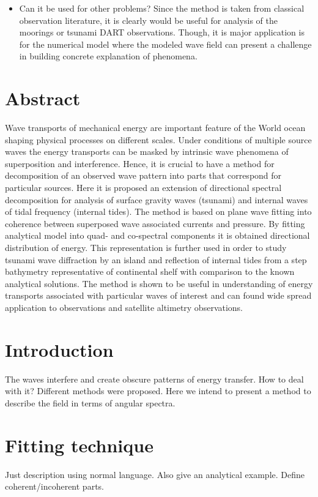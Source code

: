 \begin{itemize}
\item Can it be used for other problems?
Since the method is taken from classical observation literature, it is clearly would be useful for analysis of the moorings or tsunami DART observations. Though, it is major application is for the numerical model where the modeled wave field can present a challenge in building concrete explanation of phenomena.
\end{itemize}

\section{Abstract}
Wave transports of mechanical energy are important feature of the World ocean shaping physical processes on different scales. Under conditions of multiple source waves the energy transports can be masked by intrinsic wave phenomena of superposition and interference. Hence, it is crucial to have a method for decomposition of an observed wave pattern into parts that correspond for particular sources. Here it is proposed an extension of directional spectral decomposition for analysis of surface gravity waves (tsunami) and internal waves of tidal frequency (internal tides). The method is based on plane wave fitting into coherence between superposed wave associated currents and pressure. By fitting analytical model into quad- and co-spectral components it is obtained directional distribution of energy. This representation is further used in order to study tsunami wave diffraction by an island and reflection of internal tides from a step bathymetry representative of continental shelf with comparison to the known analytical solutions. The method is shown to be useful in understanding of energy transports associated with particular waves of interest and can found wide spread application to observations and satellite altimetry observations.

\section{Introduction}
The waves interfere and create obscure patterns of energy transfer. How to deal with it? Different methods were proposed. Here we intend to present a method to describe the field in terms of angular spectra.

\section{Fitting technique}
Just description using normal language. Also give an analytical example. Define coherent/incoherent parts.

